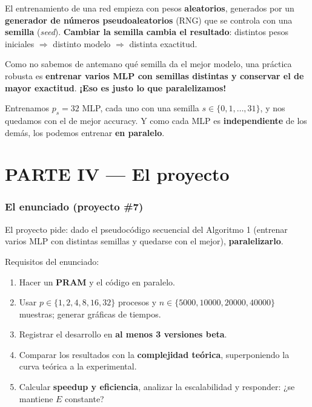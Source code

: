 \documentclass[11pt,a4paper]{article}
\newcommand{\term}[1]{\textbf{\textcolor{clave}{#1}}}
\begin{document}
\begin{importante}[title=\textbf{La pregunta clave del proyecto}]
El entrenamiento de una red empieza con pesos \textbf{aleatorios}, generados por
un \term{generador de números pseudoaleatorios} (RNG) que se controla con una
\textbf{semilla} (\emph{seed}). \textbf{Cambiar la semilla cambia el resultado}:
distintos pesos iniciales $\Rightarrow$ distinto modelo $\Rightarrow$ distinta
exactitud.

Como no sabemos de antemano qué semilla da el mejor modelo, una práctica robusta
es \textbf{entrenar varios MLP con semillas distintas y conservar el de mayor
exactitud}. \textbf{¡Eso es justo lo que paralelizamos!}
\end{importante}

Entrenamos $p_s=32$ MLP, cada uno con una semilla $s\in\{0,1,\ldots,31\}$, y nos
quedamos con el de mejor accuracy. Y como cada MLP es \textbf{independiente} de
los demás, los podemos entrenar \textbf{en paralelo}.

\part*{PARTE IV --- El proyecto}

\section{El enunciado (proyecto \#7)}

El proyecto pide: dado el pseudocódigo secuencial del Algoritmo 1 (entrenar
varios MLP con distintas semillas y quedarse con el mejor), \textbf{paralelizarlo}.

Requisitos del enunciado:
\begin{enumerate}
  \item Hacer un \textbf{PRAM} y el código en paralelo.
  \item Usar $p\in\{1,2,4,8,16,32\}$ procesos y $n\in\{5000,10000,20000,40000\}$
        muestras; generar gráficas de tiempos.
  \item Registrar el desarrollo en \textbf{al menos 3 versiones beta}.
  \item Comparar los resultados con la \textbf{complejidad teórica}, superponiendo
        la curva teórica a la experimental.
  \item Calcular \textbf{speedup y eficiencia}, analizar la escalabilidad y
        responder: ¿se mantiene $E$ constante?
\end{enumerate}
\end{document}
